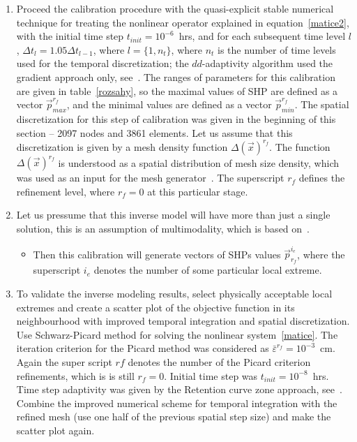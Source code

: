 \documentclass[review]{myarticle}
\begin{document}
\begin{enumerate}
\item Proceed the calibration procedure with the quasi-explicit stable numerical technique for treating the nonlinear operator explained in equation~\eqref{matice2}, with the initial time step $t_{init}= 10^{-6}$~hrs, and for each subsequent time level $l$, $\Delta t_l = 1.05 \Delta t_{l-1}$, where $l=\{1,n_t\}$, where $n_t$ is the number of time levels used for the temporal discretization; the $dd$-adaptivity algorithm used the gradient approach only, see~\citep{mojejcam2}. The ranges of parameters for this calibration are given in table~\ref{rozsahy}, so the maximal values of SHP are defined as a vector $\vec{p}^{r_f}_{max}$, and the minimal values are defined as a vector $\vec{p}^{r_f}_{min}$. The spatial discretization for this step of calibration was given in the beginning of this section -- 2097 nodes and 3861 elements. 
Let us assume that this discretization is given by a mesh density function ${\Delta}(\vec{x})^{r_f}$. The function $\Delta(\vec{x})^{r_f}$ is understood as a spatial distribution of mesh size density, which was used as an input for the mesh generator~\citep{t3d}. The superscript $r_f$ defines the refinement level, where $r_f=0$ at this particular stage.
\item Let us pressume that this inverse model will have more than just a single solution, this is an assumption of multimodality, which is based on~\citep{beven2003-uncertain}. \begin{itemize} \item Then this calibration will generate vectors of SHPs values $\vec{p}^{i_e}_{r_f}$, where the superscript $i_e$ denotes the number of some  particular local extreme. \end{itemize} 
\item To validate the inverse modeling results, select physically acceptable local extremes and create a scatter plot of the objective function in its neighbourhood  with improved temporal integration and spatial discretization.  Use Schwarz-Picard method for solving the nonlinear system~\eqref{matice}. The iteration criterion for the Picard method was considered as $\bar{\varepsilon}^{r_f}= 10^{-3}$~cm. Again the super script $rf$ denotes the number of the Picard criterion refinements, which is is still $r_f=0$. Initial time step was $t_{init} =  10^{-8}$~hrs. Time step adaptivity was given by the Retention curve zone approach, see~\citep{mojeamc}. Combine the improved numerical scheme for temporal integration with the refined mesh (use one half of the previous spatial step size) and make the scatter plot again. \label{ll0}

\end{enumerate}
\end{document}
